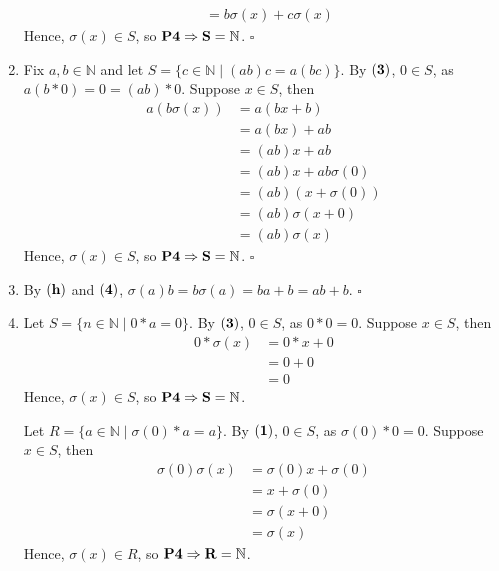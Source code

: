 \documentclass{article}
\newcommand{\N}{\mathbb{N}}
\begin{document}
\begin{enumerate}[label=\textbf{(\alph*)}]
{\begin{align*}
                        &= b\sigma(x)+c\sigma(x)  \tag{4}
      \end{align*}
      Hence, $\sigma(x) \in S$, so $\bf{P4}\Rightarrow S=\N$.
      \hfill $\square$
    }
    \item{
      Fix $a,b\in\N$ and let $S=\{c\in\N\mid(ab)c=a(bc)\}$. By $\bf{(3)}$, $0\in
      S$, as $a(b*0)=0=(ab)*0$. Suppose $x\in S$, then
      \begin{align*}
        a(b\sigma(x)) &= a(bx+b)            \tag{4}  \\
                      &= a(bx)+ab           \tag{h,e}\\
                      &= (ab)x+ab           \tag{IH} \\
                      &= (ab)x+ab\sigma(0)  \tag{h}  \\
                      &= (ab)(x+\sigma(0))  \tag{e}  \\
                      &= (ab)\sigma(x+0)    \tag{2}  \\
                      &= (ab)\sigma(x)      \tag{1}
      \end{align*}
      Hence, $\sigma(x)\in S$, so $\bf{P4}\Rightarrow S=\N$.
      \hfill $\square$
    }
    \item{
      By $\bf{(h)}$ and $\bf{(4)}$, $\sigma(a)b=b\sigma(a)=ba+b=ab+b$.
      \hfill $\square$
    }
    \item{
      Let $S=\{n\in\N\mid0*a=0\}$. By $\bf{(3)}$, $0\in S$, as $0*0=0$. Suppose
      $x\in S$, then
      \begin{align*}
        0*\sigma(x) &= 0*x+0    \tag{4} \\
                    &= 0+0      \tag{IH}\\
                    &= 0        \tag{1}
      \end{align*}
      Hence, $\sigma(x)\in S$, so $\bf{P4}\Rightarrow S=\N$.

      Let $R=\{a\in\N\mid\sigma(0)*a=a\}$. By $\bf{(1)}$, $0\in S$, as
      $\sigma(0)*0=0$. Suppose $x\in S$, then
      \begin{align*}
        \sigma(0)\sigma(x)  &= \sigma(0)x+\sigma(0) \tag{4}\\
                            &= x+\sigma(0)          \tag{IH}\\
                            &= \sigma(x+0)          \tag{2} \\
                            &= \sigma(x)            \tag{1}
      \end{align*}
      Hence, $\sigma(x) \in R$, so $\bf{P4}\Rightarrow R=\N$.

}
\end{enumerate}
\end{document}
